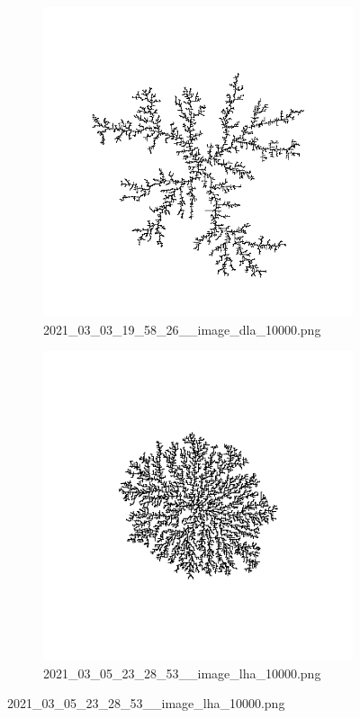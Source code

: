 \documentclass[12pt,a4paper]{scrartcl}
\numberwithin{equation}{subsection}
\newcommand{\1}{\mathbbm{1}}
\numberwithin{equation}{section}
\theoremstyle{definition}
\begin{document}
\begin{figure}[h!]
	\centering
	\begin{subfigure}[b]{.49\textwidth}
		\includegraphics[width=1\linewidth]{images/ia/2021_03_03_19_58_26__image_dla_10000.png}
		\caption{2021\_03\_03\_19\_58\_26\_\_image\_dla\_10000.png}
	\end{subfigure}
	\begin{subfigure}[b]{.49\textwidth}
		\includegraphics[width=1\linewidth]{images/ia/2021_03_05_23_28_53__image_lha_10000.png}
		\caption{2021\_03\_05\_23\_28\_53\_\_image\_lha\_10000.png}
	\end{subfigure}
\end{figure}
\end{document}
